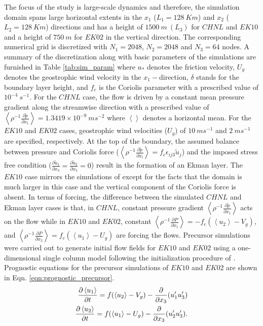 The focus of the study is large-scale dynamics and therefore, the simulation domain spans large horizontal extents in the $x_1$ ($L_{1}=128\ Km$) and $x_2$ ($L_{2}=128\ Km$) directions and has a height of $1500\ m\ (L_3)$ for $CHNL$ and $EK10$ and a height of $750\ m$ for $EK02$ in the vertical direction. The corresponding numerical grid is discretized with $N_{1}= 2048$, $N_{2}=2048$ and $N_{3}=64$ nodes. A summary of the discretization along with basic parameters of the simulations are furnished in Table \ref{tab:sim_param} where  $u_*$ denotes the friction velocity, $U_g$ denotes the geostrophic wind velocity in the $x_1-$direction, $\delta$ stands for the boundary layer height, and $f_c$ is the Coriolis parameter with a prescribed value of $10^{-4}\ s^{-1}$. For the $CHNL$ case, the flow is driven by a constant mean pressure gradient along the streamwise direction with a prescribed value of $\left < \rho^{-1} \frac{\partial \tilde{p}}{\partial x_1} \right > = 1.3419\times 10^{-9}\ ms^{-2}$ where $\left <  \right >$ denotes a horizontal mean. For the $EK10$ and $EK02$ cases, geostrophic wind velocities ($U_{g}$) of $10\ ms^{-1}$ and $2\ ms^{-1}$ are specified, respectively. At the top of the boundary, the assumed balance between pressure and Coriolis force ($\left < \rho^{-1}\frac{\partial \tilde{p} }{\partial x_i} \right > = f_c\epsilon_{ij3}\tilde{u}_j$) and the imposed stress free condition ($\frac{\partial \tilde{u}_1}{\partial x_3}=\frac{\partial \tilde{u}_2}{\partial x_3}=0$) result in the formation of an Ekman layer. The $EK10$ case mirrors the simulations of \citet{andren_brown_qjrm_94} except for the facts that the domain is much larger in this case and the vertical component of the Coriolis force is absent. In terms of forcing, the difference between the simulated $CHNL$ and Ekman layer cases is that, in $CHNL$, constant pressure gradient $\left < \rho^{-1} \frac{\partial \tilde{p}}{\partial x_1} \right >$   acts on the flow while in $EK10$ and $EK02$, constant $\left < \rho^{-1}\frac{\partial P }{\partial x_1} \right >  = -f_c (\left < u_2\right > - V_g)$, and $\left < \rho^{-1}\frac{\partial P }{\partial x_2} \right >  = f_c (\left < u_1\right > - U_g)$ are forcing the flows. Precursor simulations were carried out to generate initial flow fields for $EK10$ and $EK02$ using a one-dimensional single column model following the initialization procedure of \citet{andren_brown_qjrm_94}. Prognostic equations for the precursor simulations of $EK10$ and $EK02$ are shown in Eqn. \ref{eqn:prognostic_precursor}.
\begin{align}
\frac{\partial \left < u_{1} \right >}{\partial t}=f(\left < u_{2} \right > - V_g)-\frac{\partial }{\partial x_3}(u_{1}'u_{3}') \notag \\
\frac{\partial \left < u_{2} \right > }{\partial t}=f(\left < u_{1} \right > - U_g)-\frac{\partial }{\partial x_3}(u_{2}'u_{3}').
\label{eqn:prognostic_precursor}
\end{align} 
